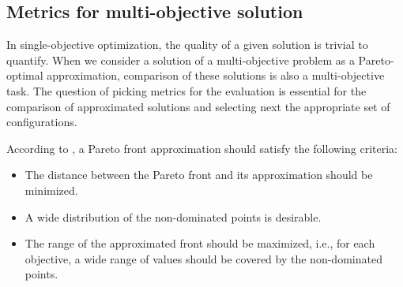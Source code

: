 

        \subsection{Metrics for multi-objective solution}
            In single-objective optimization, the quality of a given solution is trivial to quantify. When we consider a solution of a multi-objective problem as a Pareto-optimal approximation, comparison of these solutions is also a multi-objective task.
            The question of picking metrics for the evaluation is essential for the comparison of approximated solutions and selecting next the appropriate set of configurations.

            According to \cite{ZitzlerDT00}, a Pareto front approximation should satisfy the following criteria:
            \begin{itemize}
                \item The distance between the Pareto front and its approximation should be minimized.
                \item A wide distribution of the non-dominated points is desirable.
                \item The range of the approximated front should be maximized, i.e., for each objective, a wide range of values should be covered by the non-dominated points.
            \end{itemize}

